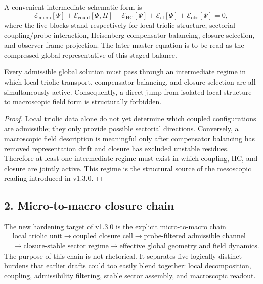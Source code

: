 A convenient intermediate schematic form is
\[
\mathcal E_{\mathrm{micro}}[\Psi]
+\mathcal E_{\mathrm{coupl}}[\Psi,\Pi]
+\mathcal E_{\mathrm{HC}}[\Psi]
+\mathcal E_{\mathrm{cl}}[\Psi]
+\mathcal E_{\mathrm{obs}}[\Psi]
=0,
\]
where the five blocks stand respectively for local triolic structure, sectorial
coupling/probe interaction, Heisenberg-compensator balancing, closure
selection, and observer-frame projection. The later master equation is to be
read as the compressed global representative of this staged balance.

\begin{lemma}
\label{lem:intermediate-balance}
Every admissible global solution must pass through an intermediate regime in
which local triolic transport, compensator balancing, and closure selection are
all simultaneously active. Consequently, a direct jump from isolated local
structure to macroscopic field form is structurally forbidden.
\end{lemma}

\begin{proof}
Local triolic data alone do not yet determine which coupled configurations are
admissible; they only provide possible sectorial directions. Conversely, a
macroscopic field description is meaningful only after compensator balancing
has removed representation drift and closure has excluded unstable residues.
Therefore at least one intermediate regime must exist in which coupling, HC,
and closure are jointly active. This regime is the structural source of the
mesoscopic reading introduced in v1.3.0.
\end{proof}

\subsection*{2. Micro-to-macro closure chain}
The new hardening target of v1.3.0 is the explicit micro-to-macro chain
\[
\begin{aligned}
&\text{local triolic unit} \longrightarrow \text{coupled closure cell} \longrightarrow \text{probe-filtered admissible channel}\\
&\longrightarrow \text{closure-stable sector regime} \longrightarrow \text{effective global geometry and field dynamics}.
\end{aligned}
\]
The purpose of this chain is not rhetorical. It separates five logically
distinct burdens that earlier drafts could too easily blend together:
local decomposition, coupling, admissibility filtering, stable sector assembly,
and macroscopic readout.

